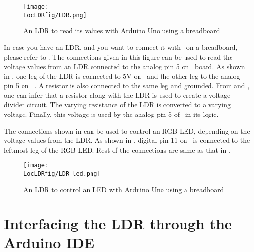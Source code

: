 \begin{figure}
  \centering
  \texttt{[image: \\LocLDRfig/LDR.png]}
  \caption{An LDR to read its values with Arduino Uno using a breadboard}
  \label{fig:ard-ldr}
\end{figure}

In case you have an LDR, and you want to connect it with \arduino\ on a breadboard, 
please refer to . The connections given in this figure can be 
used to read the voltage values from an LDR connected to the analog pin 5 on 
\arduino\ board. As shown in , one leg of the LDR is connected 
to 5V on \arduino\ and the other leg to the analog pin 5 on  \arduino. A resistor is also connected to the same leg and grounded. 
From  and , one can infer that a resistor 
along with the LDR is used to create a voltage divider circuit. The varying 
resistance of the LDR is converted to a varying voltage. Finally, this voltage is used 
by the analog pin 5 of \arduino\ in its logic. 

The connections shown in  can be used to control an RGB LED, 
depending on the voltage values from the LDR. As shown in , 
digital pin 11 on \arduino\ is connected to the leftmost leg of the RGB LED. Rest of the connections
are same as that in . 

\begin{figure}
  \centering
  \texttt{[image: \\LocLDRfig/LDR-led.png]}
  \caption{An LDR to control an LED with Arduino Uno using a breadboard}
  \label{fig:ard-ldr-led}
\end{figure}


\section{Interfacing the LDR through the Arduino IDE}
